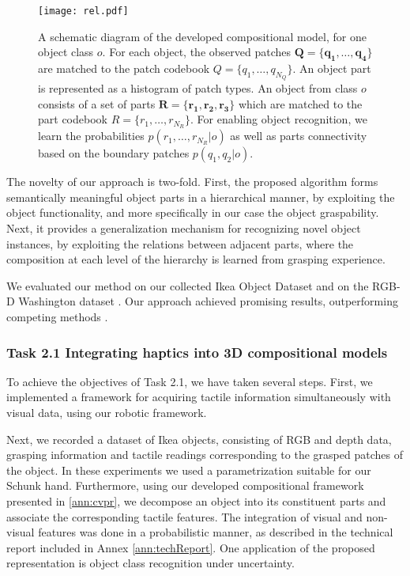 \documentclass[a4paper,11pt,pdf]{../templates/pacmanreport}
\begin{document}
\begin{figure}[h!]
\begin{center}
\texttt{[image: rel.pdf]}
\end{center}
\caption{A schematic diagram of the developed compositional model, for one object class $o$. For each object, the observed patches $\mathbf{Q}=\{\mathbf{q_1},\ldots,\mathbf{q_4}\}$ are matched to the patch codebook $Q=\{q_1,\ldots,q_{N_{Q}}\}$. An object part is represented as a histogram of patch types. An object from class $o$ consists of a set of parts $\mathbf{R}=\{\mathbf{r_1},\mathbf{r_2},\mathbf{r_3}\}$ which are matched to the part codebook $R=\{r_1,\ldots,r_{N_{R}}\}$. For enabling object recognition, we learn the probabilities $p(r_1,\ldots,r_{N_{R}} \vert o)$ as well as parts connectivity based on the boundary patches $p(q_{1},q_{2} \vert o)$.} 
\label{fig:rel}
\end{figure}

The novelty of our approach is two-fold. First, the proposed algorithm forms semantically meaningful object parts in a hierarchical manner, by exploiting the object functionality, and more specifically in our case the object graspability. Next, it provides a generalization mechanism for recognizing novel object instances, by exploiting the relations between adjacent parts, where the composition at each level of the hierarchy is learned from grasping experience.

We evaluated our method on our collected Ikea Object Dataset and on the RGB-D Washington dataset \cite{rgbd-dataset}. Our approach achieved promising results, outperforming competing methods \cite{rel7}.

\subsubsection{Task 2.1 Integrating haptics into 3D compositional models}

To achieve the objectives of Task 2.1, we have taken several steps. First, we implemented a framework for acquiring tactile information simultaneously with visual data, using our robotic framework. 

Next, we recorded a dataset of Ikea objects, consisting of RGB and depth data, grasping information and tactile readings corresponding to the grasped patches of the object. In these experiments we used a parametrization suitable for our Schunk hand. Furthermore, using our developed compositional framework presented in \ref{ann:cvpr}, we decompose an object into its constituent parts and associate the corresponding tactile features. The integration of visual and non-visual features was done in a probabilistic manner, as described in the technical report included in Annex \ref{ann:techReport}. One application of the proposed representation is object class recognition under uncertainty.
\end{document}
